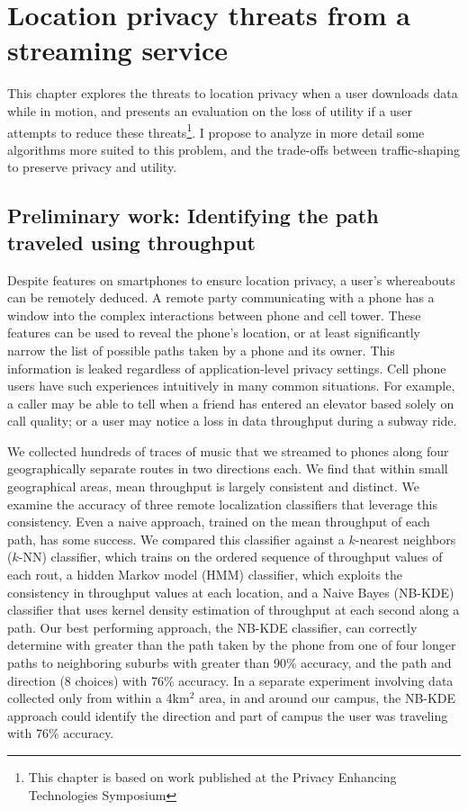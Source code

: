\chapter{Location privacy threats from a streaming service}
This chapter explores the threats to location privacy when a user downloads data while in motion, and presents an evaluation on the loss of utility if a user attempts to reduce these threats\footnote{This chapter is based on work published at the Privacy Enhancing Technologies Symposium\cite{soroush2013turning}}. I propose to analyze in more detail some algorithms more suited to this problem, and the trade-offs between traffic-shaping to preserve privacy and utility.

\section{Preliminary work: Identifying the path traveled using throughput}

Despite features on smartphones to ensure location privacy, a user's whereabouts can be remotely deduced. A remote party communicating with a phone has a window into the complex interactions between phone and cell tower. These features can be used to reveal the phone's location, or at least significantly narrow the list of possible paths taken by a phone and its owner. This information is leaked regardless of application-level privacy settings. Cell phone users have such experiences intuitively in many common situations. For example, a caller may be able to tell when a friend has entered an elevator based solely on call quality; or a user may notice a loss in data throughput during a subway ride.

We collected hundreds of traces of music that we streamed to 
phones along four geographically separate routes in two 
directions each.  We find that within small geographical areas,  
mean throughput is largely consistent and distinct. We examine 
the accuracy of three
remote localization classifiers that leverage this consistency. 
Even a naive approach, trained on the mean throughput of each path, 
has some success. 
We compared this classifier against a
$k$-nearest neighbors ($k$-NN) classifier, which trains on the ordered
sequence of throughput values of each rout, a hidden Markov model
(HMM) classifier, which exploits the consistency in throughput values
at each location, and a Naive Bayes (NB-KDE) classifier that uses
kernel density estimation of throughput at each second along a path.
Our best performing approach, the NB-KDE classifier, can correctly
determine with greater than the path taken by the phone from one of
four longer paths to neighboring suburbs with greater than 90\%
accuracy, and the path and direction (8 choices) with 76\%
accuracy. In a separate experiment involving data collected only from
within a 4km$^2$ area, in and around our campus, the NB-KDE approach
could identify the direction and part of campus the user was traveling
with 76\% accuracy.

